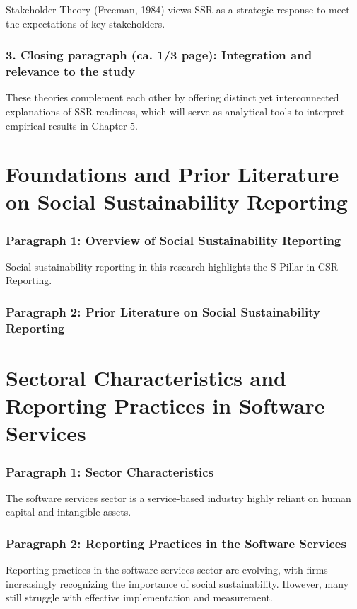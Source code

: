 Stakeholder Theory (Freeman, 1984) views SSR as a strategic response to meet the expectations of key stakeholders.

\subsubsection{3. Closing paragraph (ca. 1/3 page): Integration and relevance to the study}

These theories complement each other by offering distinct yet interconnected explanations of SSR readiness, 
which will serve as analytical tools to interpret empirical results in Chapter 5.

\section{Foundations and Prior Literature on Social Sustainability Reporting}
\subsubsection{Paragraph 1: Overview of Social Sustainability Reporting}
Social sustainability reporting in this research highlights the S-Pillar in CSR Reporting.

\subsubsection{Paragraph 2: Prior Literature on Social Sustainability Reporting}



\section{Sectoral Characteristics and Reporting Practices in Software Services}
\subsubsection{Paragraph 1: Sector Characteristics}
The software services sector is a service-based industry highly reliant on human capital and intangible assets.

\subsubsection{Paragraph 2: Reporting Practices in the Software Services}
Reporting practices in the software services sector are evolving, with firms increasingly recognizing 
the importance of social sustainability. However, many still struggle with effective implementation and measurement.

